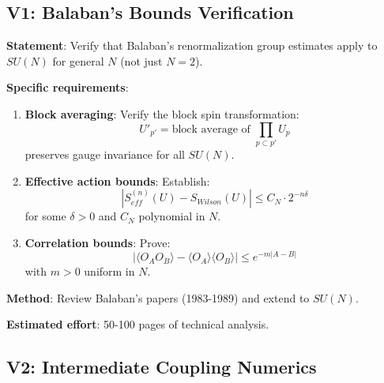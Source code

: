 \subsection{V1: Balaban's Bounds Verification}

\begin{verification}
\textbf{Statement}: Verify that Balaban's renormalization group estimates 
apply to $SU(N)$ for general $N$ (not just $N = 2$).

\textbf{Specific requirements}:
\begin{enumerate}
\item \textbf{Block averaging}: Verify the block spin transformation:
\begin{equation}
U'_{p'} = \text{block average of } \prod_{p \subset p'} U_p
\end{equation}
preserves gauge invariance for all $SU(N)$.

\item \textbf{Effective action bounds}: Establish:
\begin{equation}
|S_{eff}^{(n)}(U) - S_{Wilson}(U)| \leq C_N \cdot 2^{-n\delta}
\end{equation}
for some $\delta > 0$ and $C_N$ polynomial in $N$.

\item \textbf{Correlation bounds}: Prove:
\begin{equation}
|\langle O_A O_B \rangle - \langle O_A \rangle \langle O_B \rangle| \leq e^{-m|A-B|}
\end{equation}
with $m > 0$ uniform in $N$.
\end{enumerate}

\textbf{Method}: Review Balaban's papers (1983-1989) and extend to $SU(N)$.

\textbf{Estimated effort}: 50-100 pages of technical analysis.
\end{verification}

\subsection{V2: Intermediate Coupling Numerics}


